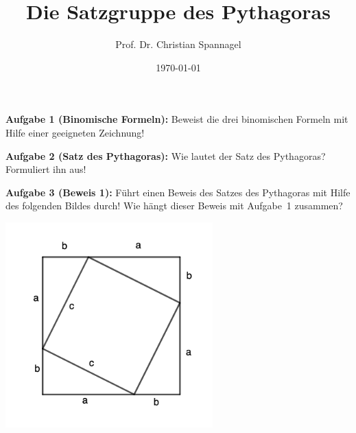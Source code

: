 \documentclass[12pt,a4paper,oneside,ngerman]{article}
\title{Die Satzgruppe des Pythagoras}
\author{Prof. Dr. Christian Spannagel}
\date{\today}
\begin{document}
\pagestyle{fancy}
\begin{center}
{\LARGE\textbf{\thetitle}}
\end{center}

\textbf{Aufgabe 1 (Binomische Formeln):}  Beweist die drei binomischen Formeln mit Hilfe einer geeigneten Zeichnung!

\textbf{Aufgabe 2 (Satz des Pythagoras):}  Wie lautet der Satz des Pythagoras? Formuliert ihn aus!

\textbf{Aufgabe 3 (Beweis 1):}  Führt einen Beweis des Satzes des Pythagoras mit Hilfe des folgenden Bildes durch! Wie hängt dieser Beweis mit Aufgabe~1 zusammen?
\begin{center}
\includegraphics[width=8cm]{satz-des-py-01.png}
\end{center}
\end{document}
